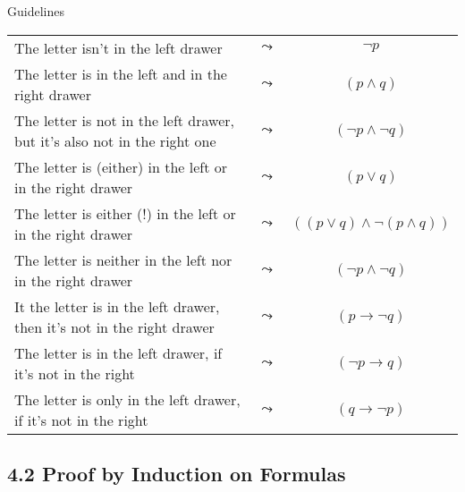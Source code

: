 \begin{frame}{Guidelines}

\begin{tabular}{p{6cm} c c}
	The letter \alert{isn't} in the left drawer & $\leadsto$ & $\neg p$\\[1ex]
	The letter is in the left \alert{and} in the right drawer & $\leadsto$ & $(p\land q)$\\[1ex]
	The letter is not in the left drawer, \alert{but} it's also not in the right one & $\leadsto$ & $(\neg p\land \neg q)$\\[1ex]
	The letter is (\alert{either}) in the left \alert{or} in the right drawer & $\leadsto$ & $(p\lor q)$\\[1ex]
	The letter is \alert{either} (!) in the left \alert{or} in the right drawer & $\leadsto$ & $((p\lor q)\land \neg(p\land q))$\\[1ex]
	The letter is \alert{neither} in the left \alert{nor} in the right drawer  & $\leadsto$ & $(\neg p\land \neg q)$\\[1ex]
	It the letter is in the left drawer, \alert{then} it's not in the right drawer & $\leadsto$ & $(p\to \neg q)$\\[1ex]
	The letter is in the left drawer, \alert{if} it's not in the right & $\leadsto$ & $(\neg p\to q)$\\[1ex]
	The letter is \alert{only} in the left drawer, \alert{if} it's not in the right & $\leadsto$ & $(q\to \neg p)$\\
	\end{tabular}

\end{frame}
		
\subsection{4.2 Proof by Induction on Formulas}


